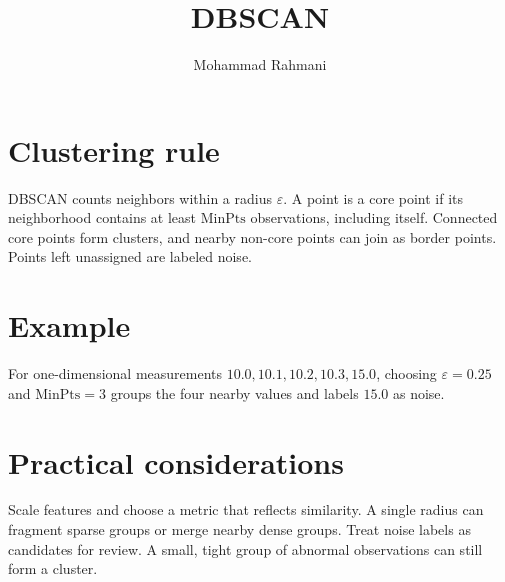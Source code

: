 \documentclass[a4paper]{article}
\title{DBSCAN}
\date{}
\author{Mohammad Rahmani}
\begin{document}
   \maketitle

\section{Clustering rule}
DBSCAN counts neighbors within a radius \(\varepsilon\). A point is a core point if its neighborhood contains at least \(\mathrm{MinPts}\) observations, including itself. Connected core points form clusters, and nearby non-core points can join as border points. Points left unassigned are labeled noise.

\section{Example}
For one-dimensional measurements \(10.0,10.1,10.2,10.3,15.0\), choosing \(\varepsilon=0.25\) and \(\mathrm{MinPts}=3\) groups the four nearby values and labels \(15.0\) as noise.

\section{Practical considerations}
Scale features and choose a metric that reflects similarity. A single radius can fragment sparse groups or merge nearby dense groups. Treat noise labels as candidates for review. A small, tight group of abnormal observations can still form a cluster.



   
   
\end{document}
